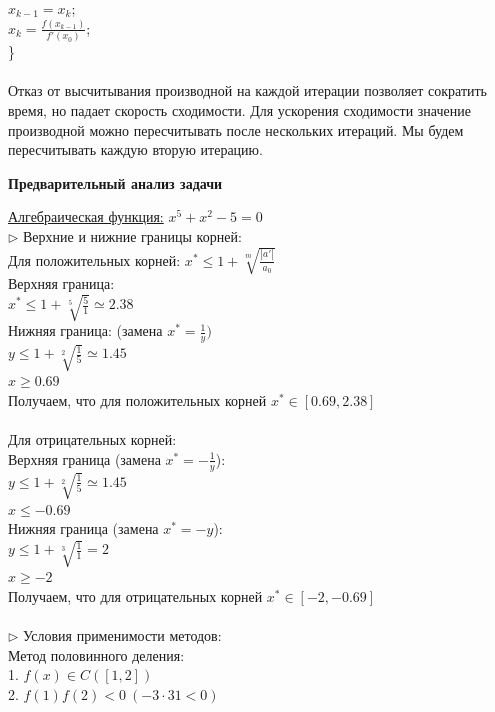\documentclass{article}
\begin{document}
	\hspace*{1cm} $x_{k-1}= x_k$;\\
	\hspace*{1cm} $x_k = \frac{f(x_{k-1})}{f'(x_0)}$;\\
	\}\\
	\\
	Отказ от высчитывания производной на каждой итерации позволяет сократить время, но падает скорость сходимости. Для ускорения сходимости значение производной можно пересчитывать после нескольких итераций. Мы будем пересчитывать каждую вторую итерацию.\\
	\newpage
	\begin{center} \textbf{Предварительный анализ задачи}\end{center}
	\underline{Алгебраическая функция:}
	$x^5 + x^2 - 5 = 0$\\
	$\triangleright$ Верхние и нижние границы корней:\\
	Для положительных корней: $x^* \le 1 + \sqrt[m]{\frac{|a'|}{a_0}}$\\
	Верхняя граница:\\
	$x^* \le 1 + \sqrt[5]{\frac{5}{1}} \simeq 2.38$\\ 
	Нижняя граница: (замена $x^* = \frac{1}{y})$\\
	$y \le 1 + \sqrt[2]{\frac{1}{5}} \simeq 1.45$\\
	$x \ge 0.69$\\
	Получаем, что для положительных корней $x^* \in [0.69, 2.38]$\\
	\\
	Для отрицательных корней:\\
	Верхняя граница (замена $x^* = -\frac{1}{y}$):\\
	$y \le 1 + \sqrt[2]{\frac{1}{5}} \simeq 1.45$\\
	$x \le -0.69$\\
	Нижняя граница (замена $x^* = -y$):\\
	$y \le 1 + \sqrt[3]{\frac{1}{1}} = 2$\\
	$x \ge -2$\\
	Получаем, что для отрицательных корней $x^* \in [-2, -0.69]$\\
	\\
	$\triangleright$ Условия применимости методов:\\
	Метод половинного деления:\\
	1. $f(x) \in C([1, 2])$\\
	2. $f(1)f(2) < 0\ (-3 \cdot 31 < 0)$\\
	\\
\end{document}
